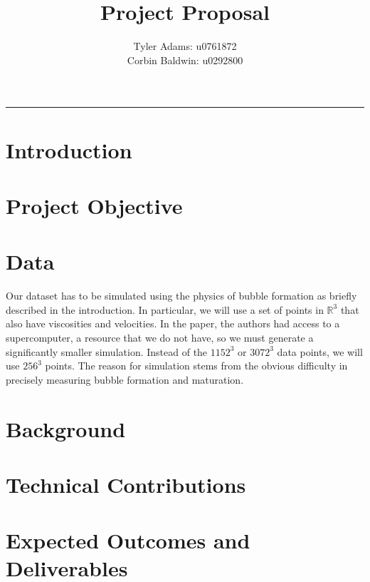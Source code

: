 \documentclass[12pt, fullpage,letterpaper]{article}
\title{Project Proposal}
\author{Tyler Adams: u0761872 \\Corbin Baldwin: u0292800}
\begin{document}
	\maketitle 
	\hrule 
	\vskip 0.5cm
	\section*{\normalfont Introduction}
  
	\section*{\normalfont Project Objective}  
	
	\section*{\normalfont Data} 

	Our dataset has to be simulated using the physics of bubble formation as briefly described in the introduction. In particular, we will use a set of points in $\mathbb{R}^3$ that also have viscosities and velocities. In the paper, the authors had access to a supercomputer, a resource that we do not have, so we must generate a significantly smaller simulation. Instead of the $1152^3$ or $3072^3$ data points, we will use $256^3$ points. The reason for simulation stems from the obvious difficulty in precisely measuring bubble formation and maturation.
	
	\section*{\normalfont Background} 
	  
	\section*{\normalfont Technical Contributions} 
	
	
	\section*{\normalfont Expected Outcomes and Deliverables}  
	
\end{document}
